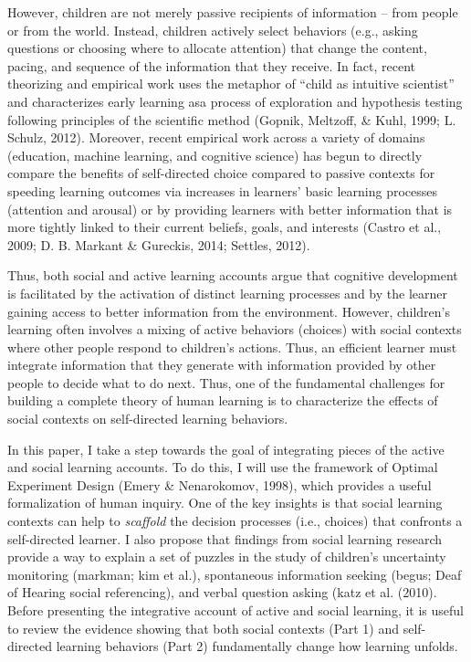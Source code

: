 \documentclass[a4paper,man,apacite,floatsintext]{apa6}
\begin{document}
However, children are not merely passive recipients of information --
from people or from the world. Instead, children actively select
behaviors (e.g., asking questions or choosing where to allocate
attention) that change the content, pacing, and sequence of the
information that they receive. In fact, recent theorizing and empirical
work uses the metaphor of ``child as intuitive scientist'' and
characterizes early learning asa process of exploration and hypothesis
testing following principles of the scientific method (Gopnik, Meltzoff,
\& Kuhl, 1999; L. Schulz, 2012). Moreover, recent empirical work across
a variety of domains (education, machine learning, and cognitive
science) has begun to directly compare the benefits of self-directed
choice compared to passive contexts for speeding learning outcomes via
increases in learners' basic learning processes (attention and arousal)
or by providing learners with better information that is more tightly
linked to their current beliefs, goals, and interests (Castro et al.,
2009; D. B. Markant \& Gureckis, 2014; Settles, 2012).

Thus, both social and active learning accounts argue that cognitive
development is facilitated by the activation of distinct learning
processes and by the learner gaining access to better information from
the environment. However, children's learning often involves a mixing of
active behaviors (choices) with social contexts where other people
respond to children's actions. Thus, an efficient learner must integrate
information that they generate with information provided by other people
to decide what to do next. Thus, one of the fundamental challenges for
building a complete theory of human learning is to characterize the
effects of social contexts on self-directed learning behaviors.

In this paper, I take a step towards the goal of integrating pieces of
the active and social learning accounts. To do this, I will use the
framework of Optimal Experiment Design (Emery \& Nenarokomov, 1998),
which provides a useful formalization of human inquiry. One of the key
insights is that social learning contexts can help to \emph{scaffold}
the decision processes (i.e., choices) that confronts a self-directed
learner. I also propose that findings from social learning research
provide a way to explain a set of puzzles in the study of children's
uncertainty monitoring (markman; kim et al.), spontaneous information
seeking (begus; Deaf of Hearing social referencing), and verbal question
asking (katz et al. (2010). Before presenting the integrative account of
active and social learning, it is useful to review the evidence showing
that both social contexts (Part 1) and self-directed learning behaviors
(Part 2) fundamentally change how learning unfolds.
\end{document}
